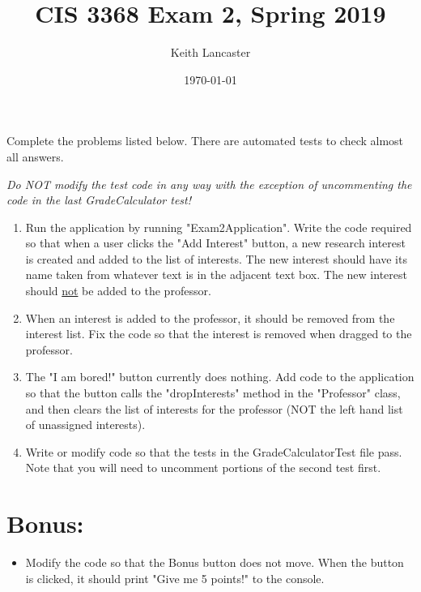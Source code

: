 \documentclass[11pt]{article}
\author{Keith Lancaster}
\date{\today}
\title{CIS 3368 Exam 2, Spring 2019}
\begin{document}
\maketitle
Complete the problems listed below. There are automated tests to check almost all answers.


\emph{Do NOT modify the test code in any way with the exception of uncommenting the code in the last GradeCalculator test!}


\begin{enumerate}
\item Run the application by running "Exam2Application". Write the code required so
that when a user clicks the "Add Interest" button, a new research interest is
created and added to the list of interests. The new interest should have its
name taken from whatever text is in the adjacent text box. The new interest
should \uline{not} be added to the professor.
\item When an interest is added to the professor, it should be removed from the
interest list. Fix the code so that the interest is removed when dragged to
the professor.
\item The "I am bored!" button currently does nothing. Add code to the application
so that the button calls the "dropInterests" method in the "Professor" class,
and then clears the list of interests for the professor (NOT the left hand
list of unassigned interests).
\item Write or modify code so that the tests in the GradeCalculatorTest file pass.
Note that you will need to uncomment portions of the second test first.
\end{enumerate}


\section{Bonus:}
\label{sec:org7161097}
\begin{itemize}
\item Modify the code so that the Bonus button does not move. When the button is clicked, it should print "Give me 5 points!" to the console.
\end{itemize}
\end{document}
